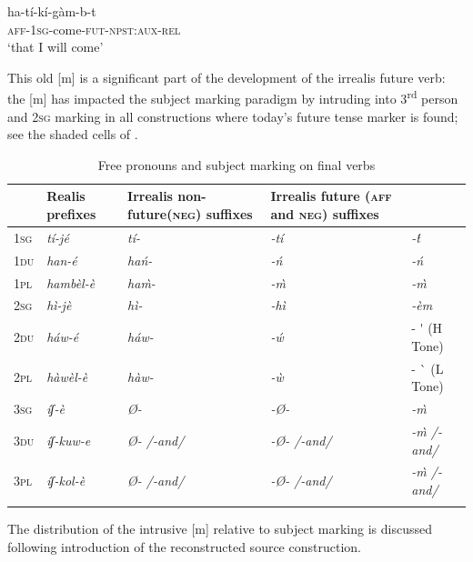 \documentclass[output=paper]{langsci/langscibook}
\begin{document}
\ea\label{ex:mahland:77}
\gll ha-tí-kí-gàm-b-t\\
  \textsc{aff-1sg}{}-come-\textsc{fut-npst:aux-rel}\\\glt `that I will come'
\z

This old [m] is a significant part of the development of the irrealis future verb: the [m] has impacted the subject marking paradigm by intruding into 3\textsuperscript{rd} person and \textsc{2sg} marking in all constructions where today's future tense marker is found; see the shaded cells of . 

\begin{table}
\caption{Free pronouns and subject marking on final verbs \citep[7]{Ahland2014b}}
\label{tab:mahland:7}
\begin{tabularx}{\textwidth}{llp{1.5cm}Xp{3.5cm}}
\lsptoprule

\multicolumn{2}{X}{ Free pronouns} &  Realis prefixes &  Irrealis non-future\newline (\textsc{neg}) suffixes &  Irrealis future \newline (\textsc{aff} and \textsc{neg}) suffixes\\
\midrule 
 \textsc{1sg} & \itshape tí-jé & \itshape tí- & \itshape {}-tí & \itshape {}-\'{t}\\
 \textsc{1du} & \itshape han-é & \itshape hań- & \itshape {}-ń & \itshape {}-ń\\
 \textsc{1pl} & \itshape hambèl-è & \itshape ha\`{m}- & \itshape {}-\`{m} & \itshape {}-\`{m}\\
 \textsc{2sg} & \itshape hì-jè & \itshape hì- & \itshape {}-hì & \itshape {}-èm \\
 \textsc{2du} & \itshape háw-é & \itshape háw- & \itshape {}-\'{w}   &  - \'{} (H Tone)\\
 \textsc{2pl} & \itshape hàwèl-è & \itshape hàw- & \itshape {}-\`{w} &  - \`{} (L Tone)\\
 \textsc{3sg} & \itshape íʃ-è & \itshape Ø- & \itshape {}-Ø- & \itshape {}-\`{m}\\
 \textsc{3du} & \itshape íʃ-kuw-e & \itshape Ø-   /-and/ & \itshape {}-Ø-   /-and/ & \itshape {}-\`{m}     /-and/\\
 \textsc{3pl} & \itshape íʃ-kol-è & \itshape Ø-   /-and/ & \itshape {}-Ø-   /-and/ & \itshape {}-\`{m}    /-and/\\
\lspbottomrule
\end{tabularx}
\end{table}

The distribution of the intrusive [m] relative to subject marking is discussed following introduction of the reconstructed source construction. 
\end{document}
